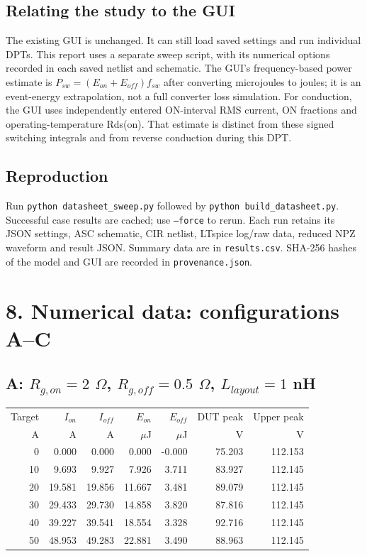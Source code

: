 \documentclass[10pt,a4paper]{article}
\begin{document}
\subsection*{Relating the study to the GUI}
The existing GUI is unchanged. It can still load saved settings and run individual DPTs. This report uses a separate sweep script, with its numerical options recorded in each saved netlist and schematic. The GUI's frequency-based power estimate is $P_{sw}=(E_{on}+E_{off})f_{sw}$ after converting microjoules to joules; it is an event-energy extrapolation, not a full converter loss simulation.
For conduction, the GUI uses independently entered ON-interval RMS current, ON fractions and operating-temperature Rds(on). That estimate is distinct from these signed switching integrals and from reverse conduction during this DPT.
\subsection*{Reproduction}
Run \texttt{python datasheet\_sweep.py} followed by \texttt{python build\_datasheet.py}. Successful case results are cached; use \texttt{--force} to rerun. Each run retains its JSON settings, ASC schematic, CIR netlist, LTspice log/raw data, reduced NPZ waveform and result JSON. Summary data are in \texttt{results.csv}. SHA-256 hashes of the model and GUI are recorded in \texttt{provenance.json}.
\newpage
\section*{8. Numerical data: configurations A--C}
\subsection*{A: $R_{g,on}=2$ $\Omega$, $R_{g,off}=0.5$ $\Omega$, $L_{layout}=1$ nH}
\begin{center}\small\begin{tabular}{rrrrrrr}\toprule Target & $I_{on}$ & $I_{off}$ & $E_{on}$ & $E_{off}$ & DUT peak & Upper peak\\ A & A & A & $\mu$J & $\mu$J & V & V\\\midrule
0 & 0.000 & 0.000 & 0.000 & -0.000 & 75.203 & 112.153\\
10 & 9.693 & 9.927 & 7.926 & 3.711 & 83.927 & 112.145\\
20 & 19.581 & 19.856 & 11.667 & 3.481 & 89.079 & 112.145\\
30 & 29.433 & 29.730 & 14.858 & 3.820 & 87.816 & 112.145\\
40 & 39.227 & 39.541 & 18.554 & 3.328 & 92.716 & 112.145\\
50 & 48.953 & 49.283 & 22.881 & 3.490 & 88.963 & 112.145\\
\bottomrule\end{tabular}\end{center}
\end{document}
